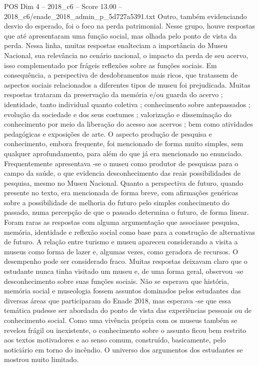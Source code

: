 \begin{textsample}{POS Dim 4 – 2018\_c6 – Score 13.00 – 2018\_c6/enade\_2018\_admin\_p\_5d727a5391.txt}
Outro, também evidenciando desvio do esperado, foi o foco na perda patrimonial.
Nesse grupo, houve respostas que até apresentaram uma função social, mas olhada pelo ponto de vista da perda.
Nessa linha, muitas respostas enalteciam a importância do Museu Nacional, sua relevância no cenário nacional, o impacto da perda de seu acervo, isso complementado por frágeis reflexões sobre as funções sociais.
Em consequência, a perspectiva de desdobramentos mais ricos, que tratassem de aspectos sociais relacionados a diferentes tipos de museu foi prejudicada.
Muitas respostas trataram da preservação da memória e/ou guarda do acervo ; identidade, tanto individual quanto coletiva ; conhecimento sobre antepassados ; evolução da sociedade e dos seus costumes ; valorização e disseminação do conhecimento por meio da liberação do acesso aos acervos ; bem como atividades pedagógicas e exposições de arte.
O aspecto produção de pesquisa e conhecimento, embora frequente, foi mencionado de forma muito simples, sem qualquer aprofundamento, para além do que já era mencionado no enunciado.
Frequentemente apresentava -se o museu como produtor de pesquisas para o campo da saúde, o que evidencia desconhecimento das reais possibilidades de pesquisa, mesmo no Museu Nacional.
Quanto a perspectiva de futuro, quando presente no texto, era mencionada de forma breve, com afirmações genéricas sobre a possibilidade de melhoria do futuro pelo simples conhecimento do passado, numa percepção de que o passado determina o futuro, de forma linear.
Foram raras as respostas com alguma argumentação que associasse pesquisa, memória, identidade e reflexão social como base para a construção de alternativas de futuro.
A relação entre turismo e museu apareceu considerando a visita a museus como forma de lazer e, algumas vezes, como geradora de recursos.
O desempenho pode ser considerado fraco.
Muitas respostas deixavam claro que o estudante nunca tinha visitado um museu e, de uma forma geral, observou -se desconhecimento sobre suas funções sociais.
Não se esperava que história, memória social e museologia fossem assuntos dominados pelos estudantes das diversas áreas que participaram do Enade 2018, mas esperava -se que essa temática pudesse ser abordada do ponto de vista das experiências pessoais ou de conhecimento social.
Como uma vivência própria com os museus também se revelou frágil ou inexistente, o conhecimento sobre o assunto ficou bem restrito aos textos motivadores e ao senso comum, construído, basicamente, pelo noticiário em torno do incêndio.
O universo dos argumentos dos estudantes se mostrou muito limitado.

\end{textsample}
